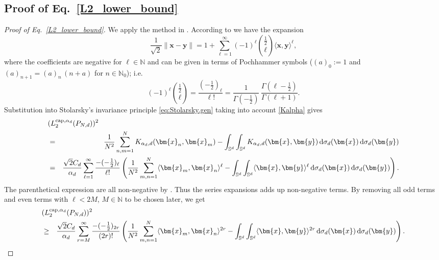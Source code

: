\documentclass[12pt]{article}
\newcommand{\fritz}[1]{{\color{blue}{#1}}}
\newcommand{\cp}{{\rm cap}}
\begin{document}
\begin{appendix}
\section{Proof of Eq.~\eqref{L2_lower_bound}}
\label{app:lower.bound}

\begin{proof}[Proof of Eq.~\eqref{L2_lower_bound}]
We apply the method in \cite{BB25}. According to \cite[Eq.~(5)]{BB25} we have the expansion 
\begin{equation*}
\frac{1}{\sqrt{2}} \| \bm{x} - \bm{y} \| 
=
1 + \sum_{\ell=1}^\infty (-1)^{\ell} \binom{\tfrac{1}{2}}{\ell} \langle \bm{x}, \bm{y} \rangle^\ell,
\end{equation*}
where the coefficients are negative for $\ell\in \mathbb{N}$ and can be given in terms of Pochhammer symbols ($(a)_0 := 1$ and $(a)_{n+1} = (a)_{n} \, (n+ a)$ for $n \in \mathbb{N}_0$); i.e.
\begin{equation*}
(-1)^{\ell} \binom{\tfrac{1}{2}}{\ell} = \frac{(-\frac{1}{2})_{\ell}}{\ell!} = \frac{1}{\Gamma( - \frac{1}{2} )} \, \frac{\Gamma( \ell - \frac{1}{2} )}{\Gamma( \ell + 1 )}. %
\end{equation*}
Substitution into Stolarsky's invariance principle \eqref{eq:Stolarsky.gen} taking into account \eqref{Kalpha} gives
\begin{eqnarray*}
\lefteqn{(L_2^{\cp,\alpha_d}(P_{N,d}))^2}  \\
& = & \frac{1}{N^2} \sum_{n,m=1}^N K_{\alpha_d,d}(\bm{x}_n, \bm{x}_m) - \int_{\mathbb{S}^d} \int_{\mathbb{S}^d} K_{\alpha_d,d}(\bm{x}, \bm{y}) \,\mathrm{d} \sigma_d(\bm{x}) \,\mathrm{d} \sigma_d(\bm{y}) \\
& = &
\frac{\sqrt{2} C_d}{\alpha_d} \sum_{\ell=1}^\infty \frac{-(-\frac{1}{2})_{\ell}}{\ell!} \left( \frac{1}{N^2} \sum_{m,n=1}^N \langle \bm{x}_m, \bm{x}_n \rangle^\ell - \int_{\mathbb{S}^d} \int_{\mathbb{S}^d} \langle \bm{x}, \bm{y} \rangle^\ell \,\mathrm{d} \sigma_d(\bm{x}) \,\mathrm{d} \sigma_d(\bm{y}) \right).
\end{eqnarray*}
The parenthetical expression are all non-negative by \cite[Lemma~1]{BB25}. Thus the series expansions adds up non-negative terms. By removing all odd terms and even terms with $\ell < 2M$, $M \in \mathbb{N}$ to be chosen later, we get 
\begin{eqnarray*}
\lefteqn{(L_2^{\cp,\alpha_d}(P_{N,d}))^2}\\
& \geq &
\frac{\sqrt{2} C_d}{\alpha_d} \sum_{r=M}^\infty \frac{-(-\frac{1}{2})_{2r}}{(2r)!} \left( \frac{1}{N^2} \sum_{m,n=1}^N \langle \bm{x}_m, \bm{x}_n \rangle^{2r} - \int_{\mathbb{S}^d} \int_{\mathbb{S}^d} \langle \bm{x}, \bm{y} \rangle^{2r} \,\mathrm{d} \sigma_d(\bm{x}) \,\mathrm{d} \sigma_d(\bm{y}) \right).

\end{eqnarray*}
\end{proof}
\end{appendix}
\end{document}
